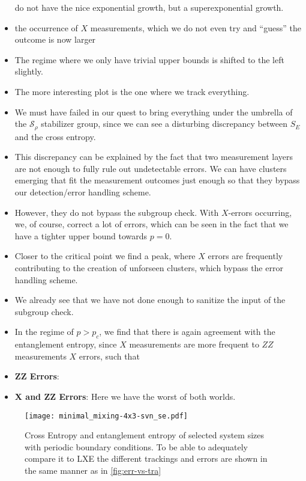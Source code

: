 \begin{itemize}
    do not have the nice exponential growth, but a superexponential growth.
  \item the occurrence of $X$ measurements, which we do not even try and
    \enquote{guess} the outcome is now larger
  \item The regime where we only have trivial upper bounds is shifted to the
    left slightly.
  \item The more interesting plot is the one where we track everything.
  \item We must have failed in our quest to bring everything under the umbrella
    of the $\mathcal{S}_\rho$ stabilizer group, since we can see a disturbing
    discrepancy between $S_E$ and the cross entropy.
  \item This discrepancy can be explained by the fact that two measurement
    layers are not enough to fully rule out undetectable errors. We can have
    clusters emerging that fit the measurement outcomes just enough so that
    they bypass our detection/error handling scheme.
  \item However, they do not bypass the subgroup check. With $X$-errors
    occurring, we, of course, correct a lot of errors, which can be seen in the
    fact that we have a tighter upper bound towards $p=0$.
  \item Closer to the critical point we find a peak, where $X$ errors are
    frequently contributing to the creation of unforseen clusters, which bypass
    the error handling scheme.
  \item We already see that we have not done enough to sanitize the input of
    the subgroup check.
  \item In the regime of $p > p_c$, we find that there is again agreement with
    the entanglement entropy, since $X$ measurements are more frequent to $ZZ$
    measurements 
    $X$ errors, such that 
  \item \textbf{ZZ Errors}:
  \item \textbf{X and ZZ Errors}: Here we have the worst of both worlds. 
\end{itemize}
\begin{figure}[H]
  \centering
  \texttt{[image: minimal\_mixing-4x3-svn\_se.pdf]}
  \caption{Cross Entropy and entanglement entropy of selected system sizes with
  periodic boundary conditions. To be able to adequately compare it to LXE the
different trackings and errors are shown in the same manner as in
\cref{fig:err-vs-tra}}
  \label{fig:min_mix-svn_se-4x3}
\end{figure}
